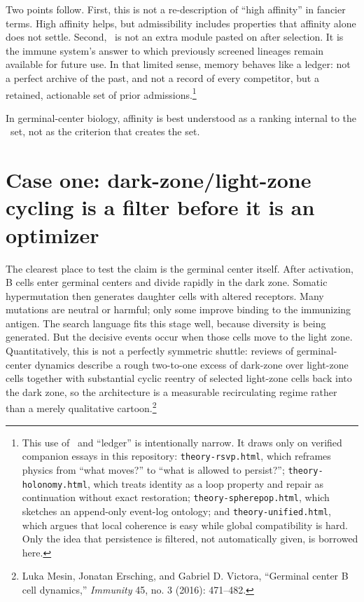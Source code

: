 \documentclass[11pt]{article}
\begin{document}
Two points follow. First, this is not a re-description of ``high affinity'' in fancier terms. High affinity helps, but admissibility includes properties that affinity alone does not settle. Second, \continuation\ is not an extra module pasted on after selection. It is the immune system's answer to which previously screened lineages remain available for future use. In that limited sense, memory behaves like a ledger: not a perfect archive of the past, and not a record of every competitor, but a retained, actionable set of prior admissions.\footnote{This use of \continuation\ and ``ledger'' is intentionally narrow. It draws only on verified companion essays in this repository: \texttt{theory-rsvp.html}, which reframes physics from ``what moves?'' to ``what is allowed to persist?''; \texttt{theory-holonomy.html}, which treats identity as a loop property and repair as continuation without exact restoration; \texttt{theory-spherepop.html}, which sketches an append-only event-log ontology; and \texttt{theory-unified.html}, which argues that local coherence is easy while global compatibility is hard. Only the idea that persistence is filtered, not automatically given, is borrowed here.}

\begin{claim}
In germinal-center biology, affinity is best understood as a ranking internal to the \admissible\ set, not as the criterion that creates the set.
\end{claim}

\section{Case one: dark-zone/light-zone cycling is a filter before it is an optimizer}
The clearest place to test the claim is the germinal center itself. After activation, B cells enter germinal centers and divide rapidly in the dark zone. Somatic hypermutation then generates daughter cells with altered receptors. Many mutations are neutral or harmful; only some improve binding to the immunizing antigen. The search language fits this stage well, because diversity is being generated. But the decisive events occur when those cells move to the light zone. Quantitatively, this is not a perfectly symmetric shuttle: reviews of germinal-center dynamics describe a rough two-to-one excess of dark-zone over light-zone cells together with substantial cyclic reentry of selected light-zone cells back into the dark zone, so the architecture is a measurable recirculating regime rather than a merely qualitative cartoon.\footnote{Luka Mesin, Jonatan Ersching, and Gabriel D. Victora, ``Germinal center B cell dynamics,'' \emph{Immunity} 45, no. 3 (2016): 471--482.}
\end{document}

